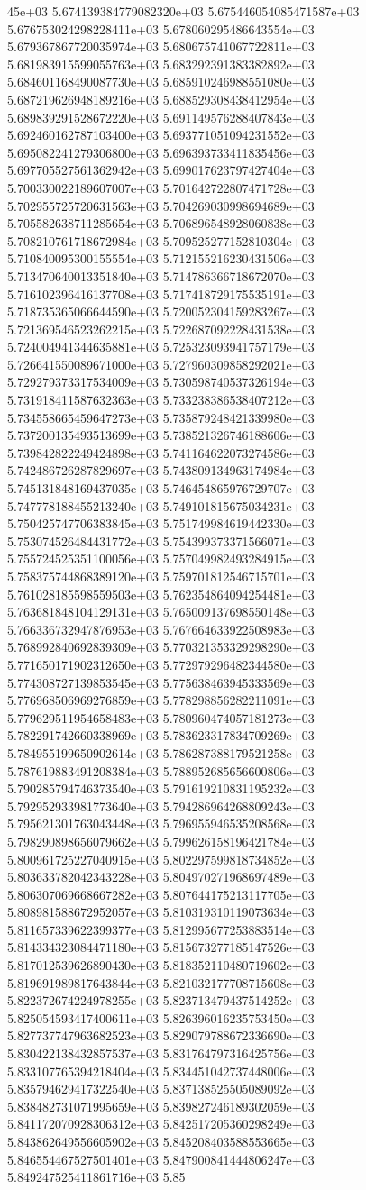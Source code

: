 45e+03	5.674139384779082320e+03	5.675446054085471587e+03	5.676753024298228411e+03	5.678060295486643554e+03	5.679367867720035974e+03	5.680675741067722811e+03	5.681983915599055763e+03	5.683292391383382892e+03	5.684601168490087730e+03	5.685910246988551080e+03	5.687219626948189216e+03	5.688529308438412954e+03	5.689839291528672220e+03	5.691149576288407843e+03	5.692460162787103400e+03	5.693771051094231552e+03	5.695082241279306800e+03	5.696393733411835456e+03	5.697705527561362942e+03	5.699017623797427404e+03	5.700330022189607007e+03	5.701642722807471728e+03	5.702955725720631563e+03	5.704269030998694689e+03	5.705582638711285654e+03	5.706896548928060838e+03	5.708210761718672984e+03	5.709525277152810304e+03	5.710840095300155554e+03	5.712155216230431506e+03	5.713470640013351840e+03	5.714786366718672070e+03	5.716102396416137708e+03	5.717418729175535191e+03	5.718735365066644590e+03	5.720052304159283267e+03	5.721369546523262215e+03	5.722687092228431538e+03	5.724004941344635881e+03	5.725323093941757179e+03	5.726641550089671000e+03	5.727960309858292021e+03	5.729279373317534009e+03	5.730598740537326194e+03	5.731918411587632363e+03	5.733238386538407212e+03	5.734558665459647273e+03	5.735879248421339980e+03	5.737200135493513699e+03	5.738521326746188606e+03	5.739842822249424898e+03	5.741164622073274586e+03	5.742486726287829697e+03	5.743809134963174984e+03	5.745131848169437035e+03	5.746454865976729707e+03	5.747778188455213240e+03	5.749101815675034231e+03	5.750425747706383845e+03	5.751749984619442330e+03	5.753074526484431772e+03	5.754399373371566071e+03	5.755724525351100056e+03	5.757049982493284915e+03	5.758375744868389120e+03	5.759701812546715701e+03	5.761028185598559503e+03	5.762354864094254481e+03	5.763681848104129131e+03	5.765009137698550148e+03	5.766336732947876953e+03	5.767664633922508983e+03	5.768992840692839309e+03	5.770321353329298290e+03	5.771650171902312650e+03	5.772979296482344580e+03	5.774308727139853545e+03	5.775638463945333569e+03	5.776968506969276859e+03	5.778298856282211091e+03	5.779629511954658483e+03	5.780960474057181273e+03	5.782291742660338969e+03	5.783623317834709269e+03	5.784955199650902614e+03	5.786287388179521258e+03	5.787619883491208384e+03	5.788952685656600806e+03	5.790285794746373540e+03	5.791619210831195232e+03	5.792952933981773640e+03	5.794286964268809243e+03	5.795621301763043448e+03	5.796955946535208568e+03	5.798290898656079662e+03	5.799626158196421784e+03	5.800961725227040915e+03	5.802297599818734852e+03	5.803633782042343228e+03	5.804970271968697489e+03	5.806307069668667282e+03	5.807644175213117705e+03	5.808981588672952057e+03	5.810319310119073634e+03	5.811657339622399377e+03	5.812995677253883514e+03	5.814334323084471180e+03	5.815673277185147526e+03	5.817012539626890430e+03	5.818352110480719602e+03	5.819691989817643844e+03	5.821032177708715608e+03	5.822372674224978255e+03	5.823713479437514252e+03	5.825054593417400611e+03	5.826396016235753450e+03	5.827737747963682523e+03	5.829079788672336690e+03	5.830422138432857537e+03	5.831764797316425756e+03	5.833107765394218404e+03	5.834451042737448006e+03	5.835794629417322540e+03	5.837138525505089092e+03	5.838482731071995659e+03	5.839827246189302059e+03	5.841172070928306312e+03	5.842517205360298249e+03	5.843862649556605902e+03	5.845208403588553665e+03	5.846554467527501401e+03	5.847900841444806247e+03	5.849247525411861716e+03	5.85